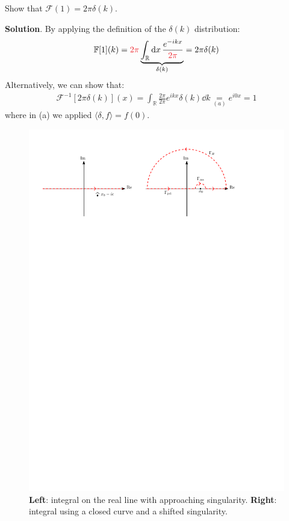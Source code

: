 \documentclass[../template.tex]{subfiles}
\begin{document}
\begin{exo}
    Show that $\mathcal{F}(1) = 2 \pi \delta (k)$.
    \medskip

    \textbf{Solution}. By applying the definition of the $\delta(k)$ distribution:
    \begin{align*}
        \mathbb{F}[1](k) = \textcolor{Red}{2\pi} \underbrace{\int_{\mathbb{R}} \dd{x} \frac{e^{-ikx}}{\textcolor{Red}{2 \pi}}}_{ \delta(k)}   = 2\pi \delta(k)
    \end{align*}
    Alternatively, we can show that:
    \begin{align*}
        \mathcal{F}^{-1}[2 \pi \delta(k)](x) = \int_{\mathbb{R}} \frac{2\pi}{2\pi} e^{ikx} \delta(k) \dd{k} \underset{(a)}{=}  e^{i0x} = 1 
    \end{align*}
    where in (a) we applied $\langle \delta, f \rangle = f(0)$.
\end{exo}
\begin{figure}[H]
    \centering
    \includegraphics{Images/residue_int.pdf}
    \caption{\textbf{Left}: integral on the real line with approaching singularity. \textbf{Right}: integral using a closed curve and a shifted singularity.\label{fig:residue}}
\end{figure}
\end{document}
